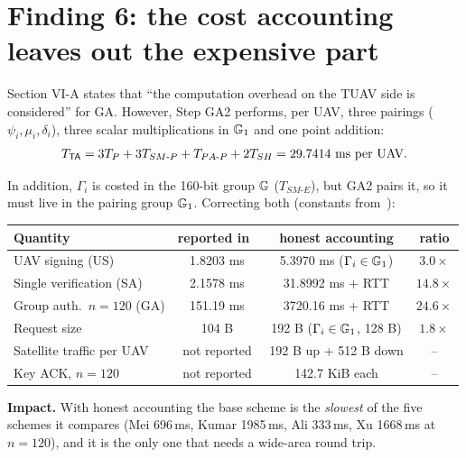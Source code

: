 \section{Finding 6: the cost accounting leaves out the expensive part}\label{sec:f6}
\begin{flawbox}[title={The reported 151\,ms excludes the TA's pairings (and the satellite delay)}]
\begin{finding}\label{f:cost}
Section VI-A states that ``the computation overhead on the TUAV side is considered'' for GA. However, Step GA2 performs, per UAV, three pairings
($\psi_i,\mu_i,\delta_i$), three scalar multiplications in $\mathbb{G}_1$ and one point addition:
\[ T_{\TA}=3T_P+3T_{SM\text{-}P}+T_{PA\text{-}P}+2T_{SH}=29.7414\ \text{ms per UAV.} \]
\end{finding}
In addition, $\Gamma_i$ is costed in the 160-bit group $\mathbb{G}$ ($T_{SM\text{-}E}$), but GA2 pairs it, so it must live in the pairing group $\mathbb{G}_1$.
Correcting both (constants from~\cite{base}):
\begin{center}\small
\begin{tabular}{@{}lccc@{}}
\toprule
Quantity & reported in~\cite{base} & honest accounting & ratio\\
\midrule
UAV signing (US) & 1.8203 ms & 5.3970 ms ($\Gamma_i\in\mathbb{G}_1$) & $3.0\times$\\
Single verification (SA) & 2.1578 ms & 31.8992 ms + RTT & $14.8\times$\\
Group auth.\ $n{=}120$ (GA) & 151.19 ms & 3720.16 ms + RTT & $24.6\times$\\
Request size & 104 B & 192 B ($\Gamma_i\in\mathbb{G}_1$, 128 B) & $1.8\times$\\
Satellite traffic per UAV & not reported & 192 B up + 512 B down & --\\
Key ACK, $n{=}120$ & not reported & 142.7 KiB each & --\\
\bottomrule
\end{tabular}
\end{center}
\textbf{Impact.} With honest accounting the base scheme is the \emph{slowest} of the five schemes it compares (Mei 696\,ms, Kumar 1985\,ms, Ali 333\,ms,
Xu 1668\,ms at $n{=}120$), and it is the only one that needs a wide-area round trip.
\end{flawbox}


